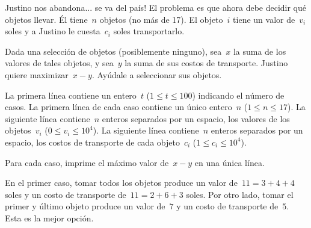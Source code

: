 
Justino nos abandona... se va del país! El problema es que ahora debe decidir qué
objetos llevar. Él tiene~$n$ objetos (no más de 17). El objeto~$i$ tiene un valor
de~$v_i$ soles y a Justino le cuesta~$c_i$ soles transportarlo.

Dada una selección de objetos (posiblemente ninguno), sea~$x$ la suma de los valores
de tales objetos, y sea~$y$ la suma de sus costos de transporte. Justino quiere
maximizar~$x - y$. Ayúdale a seleccionar sus objetos.


La primera línea contiene un entero~$t$ ($1 \leq t \leq 100$) indicando el número de
casos. La primera línea de cada caso contiene un único entero~$n$
($1 \leq n \leq 17$). La siguiente línea contiene~$n$ enteros separados por un espacio, los
valores de los objetos~$v_i$ ($0 \leq v_i \leq 10^4$). La siguiente línea
contiene~$n$ enteros separados por un espacio, los costos de transporte de cada
objeto~$c_i$ ($1 \leq c_i \leq 10^4$).

\outputText

Para cada caso, imprime el máximo valor de~$x - y$ en una única línea.

\exampleCases

\begin{example}
\end{example}

\explanationText

En el primer caso, tomar todos los objetos produce un valor de~$11 = 3 + 4 + 4$ soles
y un costo de transporte de~$11 = 2 + 6 + 3$ soles. Por otro lado, tomar el primer y
último objeto produce un valor de~$7$ y un costo de transporte de~$5$. Esta es la
mejor opción.
